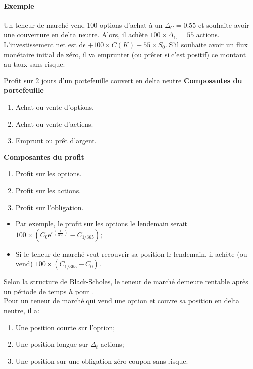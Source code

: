 \documentclass[10pt, french]{article}
\begin{document}
\begin{multicols*}{2}
\begin{definitionNOHFILLsub}
\paragraph{Exemple}	Un teneur de marché vend 100 options d'achat à un $\Delta_{C} = 0.55$ et souhaite avoir une couverture en delta neutre. Alors, il achète $100 \times \Delta_{C} = 55$ actions. L'investissement net est de $ + 100 \times C(K) - 55 \times S_{0}$. S'il souhaite avoir un flux monétaire initial de zéro, il va emprunter (ou prêter si c'est positif) ce montant au taux sans risque.
\end{definitionNOHFILLsub}

\begin{conceptgen}{Profit sur 2 jours d'un portefeuille couvert en delta neutre}
\textbf{Composantes du portefeuille}
\begin{enumerate}
	\item	Achat ou vente d'options.
	\item	Achat ou vente d'actions.
	\item	Emprunt ou prêt d'argent.
\end{enumerate}
\tcbline
\textbf{Composantes du profit}
\begin{enumerate}
	\item	Profit sur les options.
	\item	Profit sur les actions.
	\item	Profit sur l'obligation.
\end{enumerate}
\tcbline
\begin{itemize}[leftmargin = *]
	\item	Par exemple, le profit sur les options le lendemain serait $100 \times (C_{0}\textrm{e}^{r(\frac{1}{365})} - C_{1/365})$;
	\item	Si le teneur de marché veut recouvrir sa position le lendemain, il achète (ou vend) $100 \times (C_{1/365} - C_{0})$.
\end{itemize}
\end{conceptgen}

Selon la structure de Black-Scholes, le teneur de marché demeure rentable après un période de temps $h$ pour .\\

Pour un teneur de marché qui vend une option et couvre sa position en delta neutre, il a:
\begin{enumerate}
	\item	Une position courte sur l'option;
	\item	Une position longue sur $\Delta_{t}$ actions;
	\item	Une position sur une obligation zéro-coupon sans risque.
\end{enumerate}


\end{multicols*}
\end{document}
